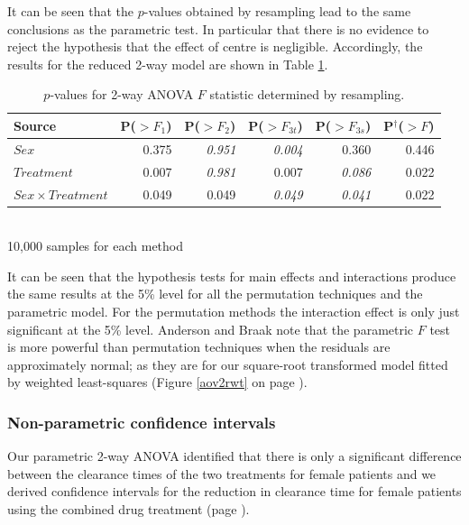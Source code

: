 It can be seen that the $p$-values obtained by resampling lead to the same conclusions as the parametric test. In particular that there is no evidence to reject the hypothesis that the effect of centre is negligible. Accordingly, the results for the reduced 2-way model are shown in Table \ref{aovresampr}.
\begin{table}[h]
\centering
\caption{$p$-values for 2-way ANOVA $F$ statistic determined by resampling.}\label{aovresampr}
\begin{tabular}{l|rrrr|r}                   
Source						&P($>F_{1}$)&P($>F_{2}$)&P($>F_{3t}$)&P($>F_{3s}$)&P$^{\dag}$($>F$)\\
\hline
$Sex$        					& 0.375 & \small{\textit{0.951}} & \small{\textit{0.004}} & 0.360 & 0.446 \\  
$Treatment$  					& 0.007 & \small{\textit{0.981}} & 0.007 			   & \small{\textit{0.086}} & 0.022 \\
$Sex\times Treatment$     		& 0.049 & 0.049 			& \small{\textit{0.049}} & \small{\textit{0.041}} & 0.022 \\
\end{tabular}\\
10,000 samples for each method
\end{table}
It can be seen that the hypothesis tests for main effects and interactions produce the same results at the 5\% level for all the permutation techniques and the parametric model. For the permutation  methods the interaction effect is only just significant at the 5\% level. Anderson and Braak\cite{anderson} note that the parametric $F$ test is more powerful than permutation techniques when the residuals are approximately normal; as they are for our square-root transformed model fitted by weighted least-squares (Figure \ref{aov2rwt} on page \pageref{aov2rwt}).

\subsubsection*{Non-parametric confidence intervals}
Our parametric 2-way ANOVA identified that there is only a significant difference between the clearance times of the two treatments for female patients and we derived confidence intervals for the reduction in clearance time for female patients using the combined drug treatment (page \pageref{compinf}).

